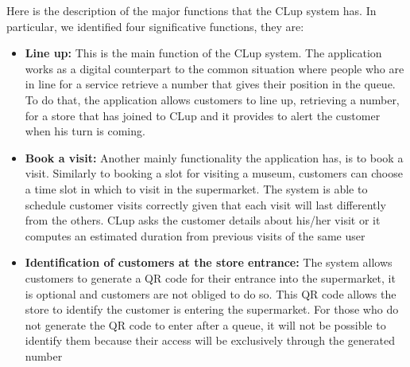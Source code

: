 Here is the description of the major functions that the CLup system has. In particular, we identified four significative functions, they are:
\begin{itemize}
    \item \textbf{Line up:} This is the main function of the CLup system. The application works as a digital counterpart to the common situation where people who are in line for a service retrieve a number that gives their position in the queue. \newline To do that, the application allows customers to line up, retrieving a number, for a store that has joined to CLup and it provides to alert the customer when his turn is coming.
    \item \textbf{Book a visit:} Another mainly functionality the application has, is to book a visit. Similarly to booking a slot for visiting a museum, customers can choose a time slot in which to visit in the supermarket. The system is able to schedule customer visits correctly given that each visit will last differently from the others. CLup asks the customer details about his/her visit or it computes an estimated duration from previous visits of the same user
    \item \textbf{Identification of customers at the store entrance:} The system allows customers to generate a QR code for their entrance into the supermarket, it is optional and customers are not obliged to do so. This QR code allows the store to identify the customer is entering the supermarket. For those who do not generate the QR code to enter after a queue, it will not be possible to identify them because their access will be exclusively through the generated number
\end{itemize}